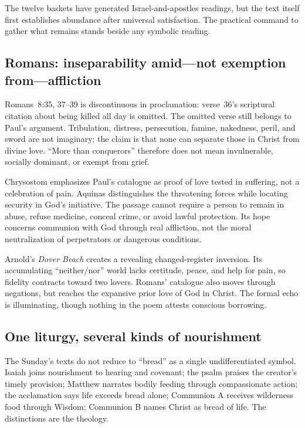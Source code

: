 The twelve baskets have generated Israel-and-apostles readings, but the text
itself first establishes abundance after universal satisfaction. The practical command to gather what remains stands beside any symbolic
reading.

\subsection*{Romans: inseparability amid—not exemption from—affliction}

Romans~8:35, 37--39 is discontinuous in proclamation: verse~36's scriptural
citation about being killed all day is omitted. The omitted verse still belongs to Paul's argument. Tribulation, distress, persecution, famine, nakedness, peril, and
sword are not imaginary; the claim is that none can separate those in Christ
from divine love. ``More than conquerors'' therefore does not mean invulnerable,
socially dominant, or exempt from grief.

Chrysostom emphasizes Paul's catalogue as proof of love tested in suffering,
not a celebration of pain. Aquinas distinguishes the threatening forces while
locating security in God's initiative. The passage cannot require a person to
remain in abuse, refuse medicine, conceal crime, or avoid lawful protection.
Its hope concerns communion with God through real affliction, not the moral
neutralization of perpetrators or dangerous conditions.

Arnold's \emph{Dover Beach} creates a revealing changed-register inversion.
Its accumulating ``neither/nor'' world lacks certitude, peace, and help for
pain, so fidelity contracts toward two lovers. Romans' catalogue also moves
through negations, but reaches the expansive prior love of God in Christ. The formal echo is illuminating, though nothing in the poem attests conscious
borrowing.

\subsection*{One liturgy, several kinds of nourishment}

The Sunday's texts do not reduce to ``bread'' as a single undifferentiated
symbol. Isaiah joins nourishment to hearing and covenant; the psalm praises
the creator's timely provision; Matthew narrates bodily feeding through
compassionate action; the acclamation says life exceeds bread alone; Communion
A receives wilderness food through Wisdom; Communion B names Christ as bread
of life. The distinctions are the theology.

